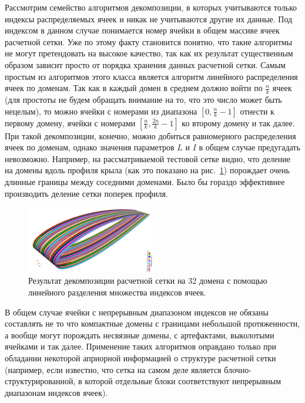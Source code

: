 Рассмотрим семейство алгоритмов декомпозиции, в которых учитываются только индексы распределяемых ячеек и никак не учитываются другие их данные.
Под индексом в данном случае понимается номер ячейки в общем массиве ячеек расчетной сетки.
Уже по этому факту становится понятно, что такие алгоритмы не могут претендовать на высокое качество, так как их результат существенным образом зависит просто от порядка хранения данных расчетной сетки.
Самым простым из алгоритмов этого класса является алгоритм линейного распределения ячеек по доменам.
Так как в каждый домен в среднем должно войти по $\frac{n}{k}$ ячеек (для простоты не будем обращать внимание на то, что это число может быть нецелым), то можно ячейки с номерами из диапазона $[0, \frac{n}{k} - 1]$ отнести к первому домену, ячейки с номерами $[\frac{n}{k}, \frac{2n}{k} - 1]$ ко второму домену и так далее.
При такой декомпозиции, конечно, можно добиться равномерного распределения ячеек по доменам, однако значения параметров $L$ и $I$ в общем случае предугадать невозможно.
Например, на рассматриваемой тестовой сетке видно, что деление на домены вдоль профиля крыла (как это показано на рис.~\ref{fig:text_2_decompsurf_wing_linear_32}) порождает очень длинные границы между соседними доменами.
Было бы гораздо эффективнее производить деление сетки поперек профиля.

\begin{figure}[ht]
	\centering
	\includegraphics[width=0.5\textwidth]{./pics/text_2_decompsurf/wing_linear_32.png}
	\caption{Результат декомпозиции расчетной сетки на 32 домена с помощью линейного разделения множества индексов ячеек.}
	\label{fig:text_2_decompsurf_wing_linear_32}
\end{figure}

В общем случае ячейки с непрерывным диапазоном индексов не обязаны составлять не то что компактные домены с границами небольшой протяженности, а вообще могут порождать несвязные домены, с артефактами, выколотыми ячейками и так далее.
Применение таких алгоритмов оправдано только при обладании некоторой априорной информацией о структуре расчетной сетки (например, если известно, что сетка на самом деле является блочно-структурированной, в которой отдельные блоки соответствуют непрерывным диапазонам индексов ячеек).

